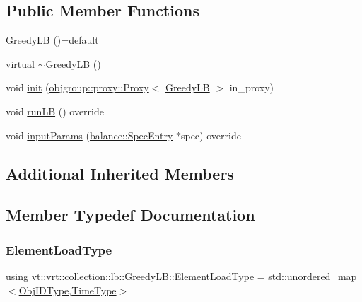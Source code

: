\subsection*{Public Member Functions}
\begin{DoxyCompactItemize}
\item 
\hyperlink{structvt_1_1vrt_1_1collection_1_1lb_1_1_greedy_l_b_a01292f5239d26023d8ff15bccfb9a501}{Greedy\+LB} ()=default
\item 
virtual \hyperlink{structvt_1_1vrt_1_1collection_1_1lb_1_1_greedy_l_b_a234935b9bb58ef4b7680be7540035c6f}{$\sim$\+Greedy\+LB} ()
\item 
void \hyperlink{structvt_1_1vrt_1_1collection_1_1lb_1_1_greedy_l_b_abfbe5625bf35d88c192aa46b83c4670a}{init} (\hyperlink{structvt_1_1objgroup_1_1proxy_1_1_proxy}{objgroup\+::proxy\+::\+Proxy}$<$ \hyperlink{structvt_1_1vrt_1_1collection_1_1lb_1_1_greedy_l_b}{Greedy\+LB} $>$ in\+\_\+proxy)
\item 
void \hyperlink{structvt_1_1vrt_1_1collection_1_1lb_1_1_greedy_l_b_ab5e726f6fe7aa749ea6e0e2a45171d36}{run\+LB} () override
\item 
void \hyperlink{structvt_1_1vrt_1_1collection_1_1lb_1_1_greedy_l_b_aec90a76fdcb1d57c9edfb6403bcc5181}{input\+Params} (\hyperlink{structvt_1_1vrt_1_1collection_1_1balance_1_1_spec_entry}{balance\+::\+Spec\+Entry} $\ast$spec) override
\end{DoxyCompactItemize}
\subsection*{Additional Inherited Members}


\subsection{Member Typedef Documentation}
\mbox{\label{structvt_1_1vrt_1_1collection_1_1lb_1_1_greedy_l_b_af08e010a34268f2a299ce37dc428ea75}} 
\subsubsection{\texorpdfstring{Element\+Load\+Type}{ElementLoadType}}
{\footnotesize\ttfamily using \hyperlink{structvt_1_1vrt_1_1collection_1_1lb_1_1_greedy_l_b_af08e010a34268f2a299ce37dc428ea75}{vt\+::vrt\+::collection\+::lb\+::\+Greedy\+L\+B\+::\+Element\+Load\+Type} =  std\+::unordered\+\_\+map$<$\hyperlink{structvt_1_1vrt_1_1collection_1_1lb_1_1_base_l_b_a15a2f756b59c8c2437985206b32aa403}{Obj\+I\+D\+Type},\hyperlink{namespacevt_a876a9d0cd5a952859c72de8a46881442}{Time\+Type}$>$}

